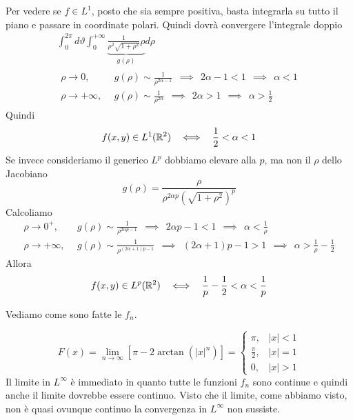Per vedere se $f\in L^{1}$, posto che sia sempre positiva, basta integrarla su tutto il piano e passare in coordinate polari. Quindi dovrà convergere l'integrale doppio
\begin{gather*}
\int ^{2\pi }_{0} d\vartheta \int ^{ + \infty }_{0}\underbrace{\frac{1}{\rho ^{2}\sqrt{1 + \rho ^{2}}} \rho }_{g(\rho)} d\rho \\
\begin{aligned}
\rho \rightarrow 0, & \ \ g(\rho)\sim \frac{1}{\rho ^{2\alpha - 1}} \ \ \implies \ \ 2\alpha - 1 < 1\ \ \implies \ \ \alpha < 1\\
\rho \rightarrow + \infty , & \ \ g(\rho)\sim \frac{1}{\rho ^{2\alpha }} \ \ \implies \ \ 2\alpha  > 1\ \ \implies \ \ \alpha  > \frac{1}{2}
\end{aligned}
\end{gather*}
Quindi
\begin{equation*}
f(x,y)\in L^{1} (\RR ^{2})\ \ \iff \ \ \frac{1}{2} < \alpha < 1
\end{equation*}
Se invece consideriamo il generico $L^{p}$ dobbiamo elevare alla $p$, ma non il $\rho $ dello Jacobiano
\begin{equation*}
g(\rho) = \frac{\rho }{\rho ^{2\alpha p}\left(\sqrt{1 + \rho ^{2}}\right)^{p}}
\end{equation*}
Calcoliamo
\begin{equation*}
\begin{aligned}
\rho \rightarrow 0^{ + } , & \ \ g(\rho)\sim \frac{1}{\rho ^{2\alpha p - 1}} \ \ \implies \ \ 2\alpha p - 1 < 1\ \ \implies \ \ \alpha < \frac{1}{\rho }\\
\rho \rightarrow + \infty , & \ \ g(\rho)\sim \frac{1}{\rho ^{(2\alpha + 1)p - 1}} \ \ \implies \ \ (2\alpha + 1)p - 1 > 1\ \ \implies \ \ \alpha  > \frac{1}{\rho } - \frac{1}{2}
\end{aligned}
\end{equation*}
Allora
\begin{equation*}
f(x,y)\in L^{p} (\RR ^{2})\ \ \iff \ \ \frac{1}{p} - \frac{1}{2} < \alpha < \frac{1}{p}
\end{equation*}
\Soluzione

Vediamo come sono fatte le $f_{n}$.

\begin{equation*}
F(x) = \lim _{n\rightarrow \infty }\left[ \pi - 2\arctan (|x|^{n})\right] = \begin{cases}
\pi , & |x| < 1\\
\frac{\pi }{2} , & |x| = 1\\
0, & |x| > 1
\end{cases}
\end{equation*}
Il limite in $L^{\infty }$ è immediato in quanto tutte le funzioni $f_{n}$ sono continue e quindi anche il limite dovrebbe essere continuo. Visto che il limite, come abbiamo visto, non è quasi ovunque continuo la convergenza in $L^{\infty }$ non sussiste.

